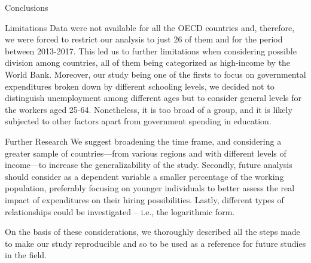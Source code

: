 \documentclass[
  ignorenonframetext,
]{beamer}
\begin{document}
\begin{frame}{Conclusions}
\protect\hypertarget{conclusions}{}
\begin{block}{Limitations}
\protect\hypertarget{limitations}{}
Data were not available for all the OECD countries and, therefore, we
were forced to restrict our analysis to just 26 of them and for the
period between 2013-2017. This led us to further limitations when
considering possible division among countries, all of them being
categorized as high-income by the World Bank. Moreover, our study being
one of the firsts to focus on governmental expenditures broken down by
different schooling levels, we decided not to distinguish unemployment
among different ages but to consider general levels for the workers aged
25-64. Nonetheless, it is too broad of a group, and it is likely
subjected to other factors apart from government spending in education.
\end{block}
\end{frame}

\begin{frame}{Further Research}
\protect\hypertarget{further-research}{}
We suggest broadening the time frame, and considering a greater sample
of countries---from various regions and with different levels of
income---to increase the generalizability of the study. Secondly, future
analysis should consider as a dependent variable a smaller percentage of
the working population, preferably focusing on younger individuals to
better assess the real impact of expenditures on their hiring
possibilities. Lastly, different types of relationships could be
investigated -- i.e., the logarithmic form.

On the basis of these considerations, we thoroughly described all the
steps made to make our study reproducible and so to be used as a
reference for future studies in the field.
\end{frame}
\end{document}
